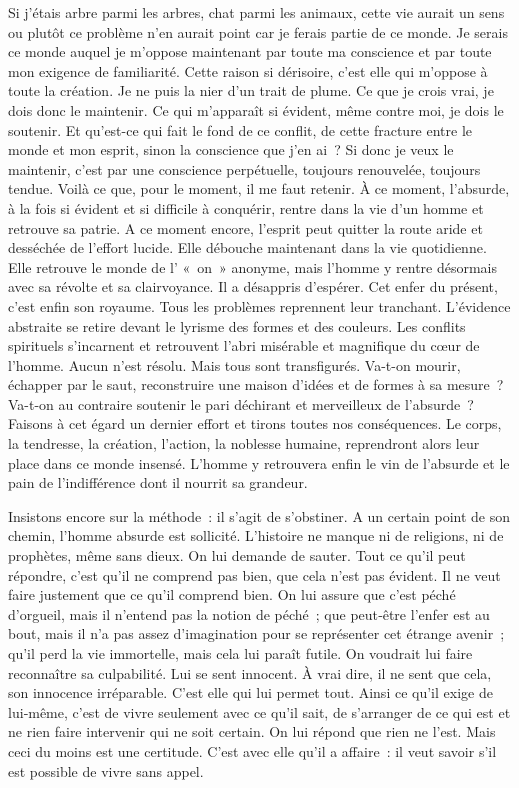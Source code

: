 \documentclass{book}
\begin{document}
Si j'étais arbre parmi les arbres, chat parmi les animaux, cette vie aurait un sens ou plutôt ce problème n'en aurait point car je ferais partie de ce monde. Je serais ce monde auquel je m'oppose maintenant par toute ma conscience et par toute mon exigence de familiarité. Cette raison si dérisoire, c'est elle qui m'oppose à toute la création. Je ne puis la nier d'un trait de plume. Ce que je crois vrai, je dois donc le maintenir. Ce qui m'apparaît si évident, même contre moi, je dois le soutenir. Et qu'est-ce qui fait le fond de ce conflit, de cette fracture entre le monde et mon esprit, sinon la conscience que j'en ai ? Si donc je veux le maintenir, c'est par une conscience perpétuelle, toujours renouvelée, toujours tendue. Voilà ce que, pour le moment, il me faut retenir. À ce moment, l'absurde, à la fois si évident et si difficile à conquérir, rentre dans la vie d'un homme et retrouve sa patrie. A ce moment encore, l'esprit peut quitter la route aride et desséchée de l'effort lucide. Elle débouche maintenant dans la vie quotidienne. Elle retrouve le monde de l' « on » anonyme, mais l'homme y rentre désormais avec sa révolte et sa clairvoyance. Il a désappris d'espérer. Cet enfer du présent, c'est enfin son royaume. Tous les problèmes reprennent leur tranchant. L'évidence abstraite se retire devant le lyrisme des formes et des couleurs. Les conflits spirituels s'incarnent et retrouvent l'abri misérable et magnifique du cœur de l'homme. Aucun n'est résolu. Mais tous sont transfigurés. Va-t-on mourir, échapper par le saut, reconstruire une maison d'idées et de formes à sa mesure ? Va-t-on au contraire soutenir le pari déchirant et merveilleux de l'absurde ? Faisons à cet égard un dernier effort et tirons toutes nos conséquences. Le corps, la tendresse, la création, l'action, la noblesse humaine, reprendront alors leur place dans ce monde insensé. L'homme y retrouvera enfin le vin de l'absurde et le pain de l'indifférence dont il nourrit sa grandeur.

Insistons encore sur la méthode : il s'agit de s'obstiner. A un certain point de son chemin, l'homme absurde est sollicité. L'histoire ne manque ni de religions, ni de prophètes, même sans dieux. On lui demande de sauter. Tout ce qu'il peut répondre, c'est qu'il ne comprend pas bien, que cela n'est pas évident. Il ne veut faire justement que ce qu'il comprend bien. On lui assure que c'est péché d'orgueil, mais il n'entend pas la notion de péché ; que peut‑être l'enfer est au bout, mais il n'a pas assez d'imagination pour se représenter cet étrange avenir ; qu'il perd la vie immortelle, mais cela lui paraît futile. On voudrait lui faire reconnaître sa culpabilité. Lui se sent innocent. À vrai dire, il ne sent que cela, son innocence irréparable. C'est elle qui lui permet tout. Ainsi ce qu'il exige de lui‑même, c'est de vivre seulement avec ce qu'il sait, de s'arranger de ce qui est et ne rien faire intervenir qui ne soit certain. On lui répond que rien ne l'est. Mais ceci du moins est une certitude. C'est avec elle qu'il a affaire : il veut savoir s'il est possible de vivre sans appel.
\end{document}
